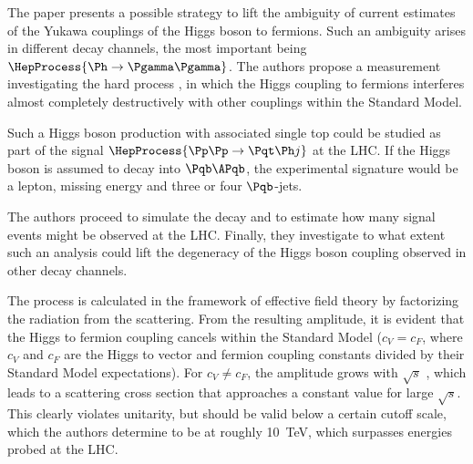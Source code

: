 

The paper\cite{farina} presents a possible strategy to lift the ambiguity of current estimates of the Yukawa couplings of the Higgs boson to fermions.
Such an ambiguity arises in different decay channels, the most important being $\HepProcess{\Ph\to\Pgamma\Pgamma}$.
The authors propose a measurement investigating the hard process \HepProcess{\PW\Pqb\to\Pqt\Ph}, in which the Higgs coupling to fermions interferes almost completely destructively with other couplings within the Standard Model.

Such a Higgs boson production with associated single top could be studied as part of the signal $\HepProcess{\Pp\Pp\to\Pqt\Ph j}$ at the LHC.
If the Higgs boson is assumed to decay into $\Pqb\APqb$, the experimental signature would be a lepton, missing energy and three or four $\Pqb$-jets.

The authors proceed to simulate the decay and to estimate how many signal events might be observed at the LHC.
Finally, they investigate to what extent such an analysis could lift the degeneracy of the Higgs boson coupling observed in other decay channels.

The process \HepProcess{\PW\Pqb\to\Pqt\Ph} is calculated in the framework of effective field theory by factorizing the \PW radiation from the \Pqb scattering.
From the resulting amplitude, it is evident that the Higgs to fermion coupling cancels within the Standard Model ($c_V = c_F$, where $c_V$ and $c_F$ are the Higgs to vector and fermion coupling constants divided by their Standard Model expectations).
For $c_V \neq c_F$, the amplitude grows with $\sqrt{s}$ , which leads to a scattering cross section that approaches a constant value for large $\sqrt{s}$.
This clearly violates unitarity, but should be valid below a certain cutoff scale, which the authors determine to be at roughly \SI{10}{TeV}, which surpasses energies probed at the LHC.

